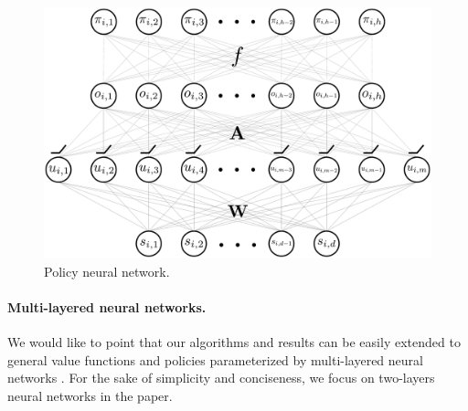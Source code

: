 
\begin{figure}[t]
\vskip 0.2in
\begin{center}
\centerline{\includegraphics[width=\columnwidth]{nn_policy.pdf}}
\caption{Policy neural network.}
\label{fig:nn_policy}
\end{center}
\vskip -0.2in
\end{figure}


\paragraph{Multi-layered neural networks.} We would like to point that our algorithms and results can be easily extended to general value functions and policies parameterized by multi-layered neural networks \citep{allen2018convergenceA,allen2018convergenceB,du2018gradientA}. For the sake of simplicity and conciseness, we focus on two-layers neural networks in the paper.


